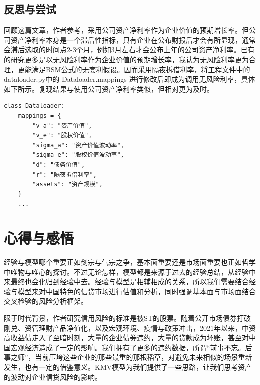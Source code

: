 \documentclass[a4paper,12pt]{ctexart}
\begin{document}
\subsection{反思与尝试}

回顾这篇文章，作者参考\citet{夏红芳2007基于}，采用公司资产净利率作为企业价值的预期增长率。但公司资产净利率本身是一个滞后性指标，只有企业在公布财报后才会有所显现，通常会滞后选取的时间点2-3个月，例如3月左右才会公布上年的公司资产净利率。已有的研究更多是以无风险利率作为企业价值的预期增长率，我认为无风险利率更为合理，更能满足BSM公式的无套利假设。因而采用隔夜拆借利率，将工程文件中的 dataloader.py中的 Dataloader.mappings 进行修改后即成为调用无风险利率，具体如下所示。复现结果与使用公司资产净利率类似，但相对更为及时。

\begin{verbatim}
class Dataloader:
    mappings = {
        "v_a": "资产价值",
        "v_e": "股权价值",
        "sigma_a": "资产价值波动率",
        "sigma_e": "股权价值波动率",
        "d": "债务价值",
        "r": "隔夜拆借利率",
        "assets": "资产规模",
    }
    ...
\end{verbatim}

\section{心得与感悟}
经验与模型哪个重要正如剑宗与气宗之争，基本面重要还是市场面重要也正如哲学中唯物与唯心的探讨。不过无论怎样，模型都是来源于过去的经验总结，从经验中来最终也会化归到经验中去。经验与模型是相辅相成的关系，所以我们需要结合经验与模型来对中国特色的信贷市场进行估值和分析，同时强调基本面与市场面结合交叉检验的风险分析框架。

限于时代背景，作者研究信用风险的标准是被ST的股票。随着公开市场债券打破刚兑、资管理财产品净值化，以及宏观环境、疫情与政策冲击，2021年以来，中资高收益债走入了至暗时刻，大量的企业债券违约，大量的贷款成为坏账，甚至对中国宏观经济造成了一定的影响。我们拥有了更多的违约数据，所谓“前事不忘。后事之师”，当前压垮这些企业的那些最重的那根稻草，对避免未来相似的场景重新发生，也有一定的借鉴意义。KMV模型为我们提供了一些思路，让我们思考资产的波动对企业信贷风险的影响。
\end{document}
